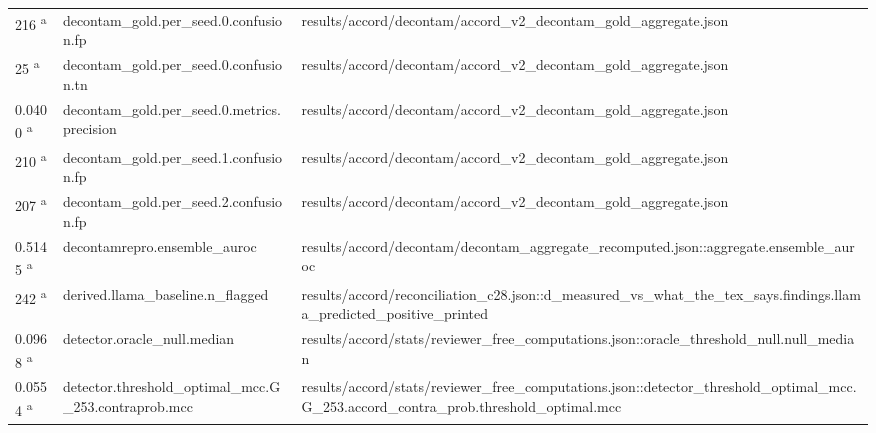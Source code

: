 \begin{longtable}{@{}p{0.7in}p{1.9in}p{2.6in}@{}}
216 \textsuperscript{a} & decontam\_gold.\allowbreak{}per\_seed.\allowbreak{}0.\allowbreak{}confusion.\allowbreak{}fp & results/\allowbreak{}accord/\allowbreak{}decontam/\allowbreak{}accord\_v2\_decontam\_gold\_aggregate.\allowbreak{}json\\
25 \textsuperscript{a} & decontam\_gold.\allowbreak{}per\_seed.\allowbreak{}0.\allowbreak{}confusion.\allowbreak{}tn & results/\allowbreak{}accord/\allowbreak{}decontam/\allowbreak{}accord\_v2\_decontam\_gold\_aggregate.\allowbreak{}json\\
0.0400 \textsuperscript{a} & decontam\_gold.\allowbreak{}per\_seed.\allowbreak{}0.\allowbreak{}metrics.\allowbreak{}precision & results/\allowbreak{}accord/\allowbreak{}decontam/\allowbreak{}accord\_v2\_decontam\_gold\_aggregate.\allowbreak{}json\\
210 \textsuperscript{a} & decontam\_gold.\allowbreak{}per\_seed.\allowbreak{}1.\allowbreak{}confusion.\allowbreak{}fp & results/\allowbreak{}accord/\allowbreak{}decontam/\allowbreak{}accord\_v2\_decontam\_gold\_aggregate.\allowbreak{}json\\
207 \textsuperscript{a} & decontam\_gold.\allowbreak{}per\_seed.\allowbreak{}2.\allowbreak{}confusion.\allowbreak{}fp & results/\allowbreak{}accord/\allowbreak{}decontam/\allowbreak{}accord\_v2\_decontam\_gold\_aggregate.\allowbreak{}json\\
0.5145 \textsuperscript{a} & decontamrepro.\allowbreak{}ensemble\_auroc & results/\allowbreak{}accord/\allowbreak{}decontam/\allowbreak{}decontam\_aggregate\_recomputed.\allowbreak{}json::aggregate.\allowbreak{}ensemble\_auroc\\
242 \textsuperscript{a} & derived.\allowbreak{}llama\_baseline.\allowbreak{}n\_flagged & results/\allowbreak{}accord/\allowbreak{}reconciliation\_c28.\allowbreak{}json::d\_measured\_vs\_what\_the\_tex\_says.\allowbreak{}findings.\allowbreak{}llama\_predicted\_positive\_printed\\
0.0968 \textsuperscript{a} & detector.\allowbreak{}oracle\_null.\allowbreak{}median & results/\allowbreak{}accord/\allowbreak{}stats/\allowbreak{}reviewer\_free\_computations.\allowbreak{}json::oracle\_threshold\_null.\allowbreak{}null\_median\\
0.0554 \textsuperscript{a} & detector.\allowbreak{}threshold\_optimal\_mcc.\allowbreak{}G\_253.\allowbreak{}contraprob.\allowbreak{}mcc & results/\allowbreak{}accord/\allowbreak{}stats/\allowbreak{}reviewer\_free\_computations.\allowbreak{}json::detector\_threshold\_optimal\_mcc.\allowbreak{}G\_253.\allowbreak{}accord\_contra\_prob.\allowbreak{}threshold\_optimal.\allowbreak{}mcc\\

\end{longtable}
